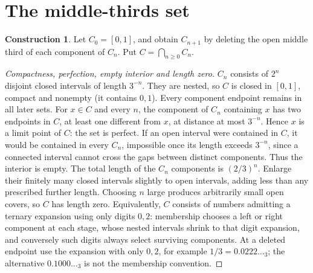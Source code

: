 \documentclass[11pt,oneside,a4paper]{book}
\theoremstyle{definition}
\newtheorem{construction}[theorem]{Construction}
\theoremstyle{remark}
\newcommand{\KEntry}[2]{\Needspace{7\baselineskip}\section{#2}\label{#1}{\small\sffamily\color{black!60}\detokenize{#1}}\par}
\begin{document}
\KEntry{K03.08.cantor_set}{The middle-thirds set}
\begin{construction}
Let $C_0=[0,1]$, and obtain $C_{n+1}$ by deleting the open middle third
of each component of $C_n$. Put $C=\bigcap_{n\ge0}C_n$.
\end{construction}
\begin{proof}[Compactness, perfection, empty interior and length zero]
$C_n$ consists of $2^n$ disjoint closed intervals of length $3^{-n}$.
They are nested, so $C$ is closed in $[0,1]$, compact and nonempty
(it contains $0,1$). Every component endpoint remains in all later sets.
For $x\in C$ and every $n$, the component of $C_n$ containing $x$ has
two endpoints in $C$, at least one different from $x$, at distance at most
$3^{-n}$. Hence $x$ is a limit point of $C$: the set is perfect.
If an open interval were contained in $C$, it would be contained in every
$C_n$, impossible once its length exceeds $3^{-n}$, since a connected
interval cannot cross the gaps between distinct components. Thus the
interior is empty. The total length of the $C_n$ components is $(2/3)^n$.
Enlarge their finitely many closed intervals slightly to open intervals,
adding less than any prescribed further length. Choosing $n$ large
produces arbitrarily small open covers, so $C$ has length zero.
Equivalently, $C$ consists of numbers admitting a ternary expansion using
only digits $0,2$: membership chooses a left or right component at each
stage, whose nested intervals shrink to that digit expansion, and conversely
such digits always select surviving components. At a deleted endpoint
use the expansion with only $0,2$, for example $1/3=0.0222\ldots_3$;
the alternative $0.1000\ldots_3$ is not the membership convention.
\end{proof}
\end{document}

